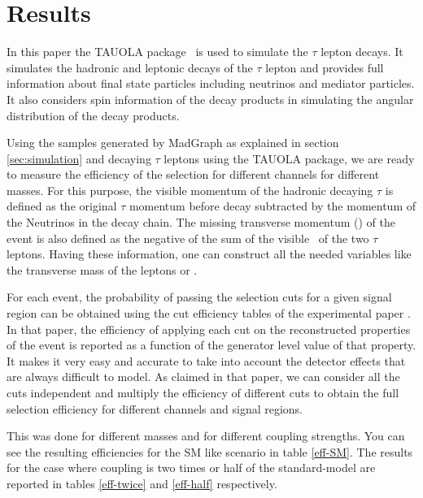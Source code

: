 \section{Results}\label{sec:results} 


In this paper the TAUOLA package~\cite{Davidson:2010rw} is used to simulate the $\tau$ lepton decays. It simulates the hadronic and leptonic decays of the $\tau$ lepton and provides full information about final state particles including neutrinos and mediator particles. It also considers spin information of the decay products in simulating the angular distribution of the decay products.

Using the \wprime samples generated by MadGraph as explained in section \ref{sec:simulation} and decaying $\tau$ leptons using the TAUOLA package, we are ready to measure the efficiency of the selection for different channels for different \wprime masses. For this purpose, the visible momentum of the hadronic decaying $\tau$ is defined as the original $\tau$ momentum before decay subtracted by the momentum of the Neutrinos in the decay chain. The missing transverse momentum (\MET) of the event is also defined as the negative of the sum of the visible \pt ~of the two $\tau$ leptons. Having these information, one can construct all the needed variables like the transverse mass of the leptons or \mttwo. 

For each event, the probability of passing the selection cuts for a given signal region can be obtained using the cut efficiency tables of the experimental paper \cite{Khachatryan:2016trj}. In that paper, the efficiency of applying each cut on the reconstructed properties of the event is reported as a function of the generator level value of that property. It makes it very easy and accurate to take into account the detector effects that are always difficult to model. As claimed in that paper, we can consider all the cuts independent and multiply the efficiency of different cuts to obtain the full selection efficiency for different channels and signal regions.

This was done for different \wprime masses and for different coupling strengths. You can see the resulting efficiencies for the SM like scenario in table \ref{eff-SM}. The results for the case where coupling is two times or half of the standard-model are reported in tables \ref{eff-twice} and \ref{eff-half} respectively.

